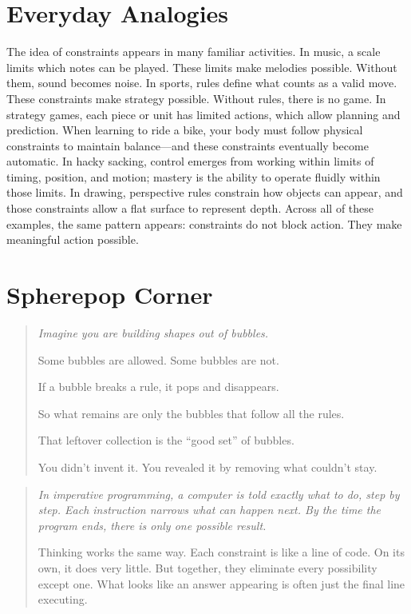 \documentclass[11pt]{book}
\theoremstyle{definition}
\theoremstyle{remark}
\newenvironment{literaryaside}
  {\begin{quote}\small\itshape}
  {\end{quote}}
\newenvironment{spherepopjunior}
  {\begin{quote}\small\itshape}
  {\end{quote}}
\begin{document}
\section*{Everyday Analogies}

The idea of constraints appears in many familiar activities. In music,
a scale limits which notes can be played. These limits make melodies
possible. Without them, sound becomes noise. In sports, rules define
what counts as a valid move. These constraints make strategy possible.
Without rules, there is no game. In strategy games, each piece or unit
has limited actions, which allow planning and prediction. When learning
to ride a bike, your body must follow physical constraints to maintain
balance---and these constraints eventually become automatic. In hacky
sacking, control emerges from working within limits of timing, position,
and motion; mastery is the ability to operate fluidly within those
limits. In drawing, perspective rules constrain how objects can appear,
and those constraints allow a flat surface to represent depth. Across
all of these examples, the same pattern appears: constraints do not
block action. They make meaningful action possible.

\section*{Spherepop Corner}

\begin{spherepopjunior}
Imagine you are building shapes out of bubbles.

Some bubbles are allowed. Some bubbles are not.

If a bubble breaks a rule, it pops and disappears.

So what remains are only the bubbles that follow all the rules.

That leftover collection is the ``good set'' of bubbles.

You didn't invent it. You revealed it by removing what couldn't stay.
\end{spherepopjunior}

\begin{literaryaside}
In imperative programming, a computer is told exactly what to do, step
by step. Each instruction narrows what can happen next. By the time the
program ends, there is only one possible result.

Thinking works the same way. Each constraint is like a line of code. On
its own, it does very little. But together, they eliminate every
possibility except one. What looks like an answer appearing is often
just the final line executing.
\end{literaryaside}
\end{document}
